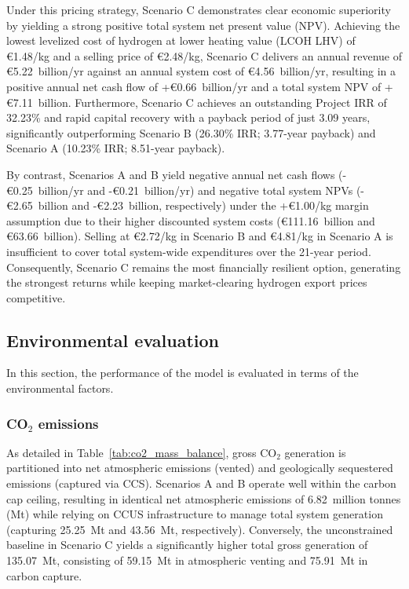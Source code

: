 \documentclass[preprint,12pt]{elsarticle}
\begin{document}
Under this pricing strategy, Scenario C demonstrates clear economic superiority by yielding a strong positive total system net present value (NPV). Achieving the lowest levelized cost of hydrogen at lower heating value (LCOH LHV) of €1.48/kg and a selling price of €2.48/kg, Scenario C delivers an annual revenue of €5.22~billion/yr against an annual system cost of €4.56~billion/yr, resulting in a positive annual net cash flow of +€0.66~billion/yr and a total system NPV of +€7.11~billion. Furthermore, Scenario C achieves an outstanding Project IRR of 32.23\% and rapid capital recovery with a payback period of just 3.09 years, significantly outperforming Scenario B (26.30\% IRR; 3.77-year payback) and Scenario A (10.23\% IRR; 8.51-year payback).

By contrast, Scenarios A and B yield negative annual net cash flows (-€0.25~billion/yr and -€0.21~billion/yr) and negative total system NPVs (-€2.65~billion and -€2.23~billion, respectively) under the +€1.00/kg margin assumption due to their higher discounted system costs (€111.16~billion and €63.66~billion). Selling at €2.72/kg in Scenario B and €4.81/kg in Scenario A is insufficient to cover total system-wide expenditures over the 21-year period. Consequently, Scenario C remains the most financially resilient option, generating the strongest returns while keeping market-clearing hydrogen export prices competitive.

\subsection{Environmental evaluation}
In this section, the performance of the model is evaluated in terms of the environmental factors.

\subsubsection{CO$_2$ emissions}
\label{sec:co2_emis}
As detailed in Table~\ref{tab:co2_mass_balance}, gross $\text{CO}_2$ generation is partitioned into net atmospheric emissions (vented) and geologically sequestered emissions (captured via CCS). Scenarios A and B operate well within the carbon cap ceiling, resulting in identical net atmospheric emissions of 6.82~million tonnes (Mt) while relying on CCUS infrastructure to manage total system generation (capturing 25.25~Mt and 43.56~Mt, respectively). Conversely, the unconstrained baseline in Scenario C yields a significantly higher total gross generation of 135.07~Mt, consisting of 59.15~Mt in atmospheric venting and 75.91~Mt in carbon capture.
\end{document}
